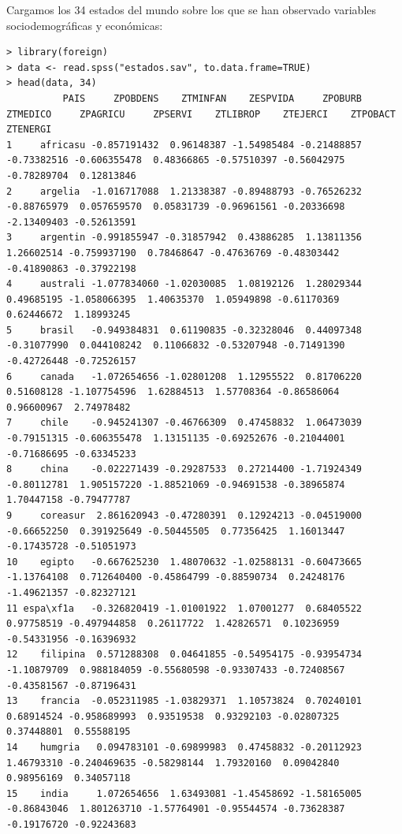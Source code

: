 \documentclass[12pt,twoside]{report}
\begin{document}
Cargamos los 34 estados del mundo sobre los que se han observado variables sociodemográficas y económicas:
\tiny \begin{verbatim}
> library(foreign)
> data <- read.spss("estados.sav", to.data.frame=TRUE)
> head(data, 34)
          PAIS     ZPOBDENS    ZTMINFAN    ZESPVIDA     ZPOBURB    ZTMEDICO     ZPAGRICU     ZPSERVI    ZTLIBROP    ZTEJERCI    ZTPOBACT    ZTENERGI
1     africasu -0.857191432  0.96148387 -1.54985484 -0.21488857 -0.73382516 -0.606355478  0.48366865 -0.57510397 -0.56042975 -0.78289704  0.12813846
2     argelia  -1.016717088  1.21338387 -0.89488793 -0.76526232 -0.88765979  0.057659570  0.05831739 -0.96961561 -0.20336698 -2.13409403 -0.52613591
3     argentin -0.991855947 -0.31857942  0.43886285  1.13811356  1.26602514 -0.759937190  0.78468647 -0.47636769 -0.48303442 -0.41890863 -0.37922198
4     australi -1.077834060 -1.02030085  1.08192126  1.28029344  0.49685195 -1.058066395  1.40635370  1.05949898 -0.61170369  0.62446672  1.18993245
5     brasil   -0.949384831  0.61190835 -0.32328046  0.44097348 -0.31077990  0.044108242  0.11066832 -0.53207948 -0.71491390 -0.42726448 -0.72526157
6     canada   -1.072654656 -1.02801208  1.12955522  0.81706220  0.51608128 -1.107754596  1.62884513  1.57708364 -0.86586064  0.96600967  2.74978482
7     chile    -0.945241307 -0.46766309  0.47458832  1.06473039 -0.79151315 -0.606355478  1.13151135 -0.69252676 -0.21044001 -0.71686695 -0.63345233
8     china    -0.022271439 -0.29287533  0.27214400 -1.71924349 -0.80112781  1.905157220 -1.88521069 -0.94691538 -0.38965874  1.70447158 -0.79477787
9     coreasur  2.861620943 -0.47280391  0.12924213 -0.04519000 -0.66652250  0.391925649 -0.50445505  0.77356425  1.16013447 -0.17435728 -0.51051973
10    egipto   -0.667625230  1.48070632 -1.02588131 -0.60473665 -1.13764108  0.712640400 -0.45864799 -0.88590734  0.24248176 -1.49621357 -0.82327121
11 espa\xf1a   -0.326820419 -1.01001922  1.07001277  0.68405522  0.97758519 -0.497944858  0.26117722  1.42826571  0.10236959 -0.54331956 -0.16396932
12    filipina  0.571288308  0.04641855 -0.54954175 -0.93954734 -1.10879709  0.988184059 -0.55680598 -0.93307433 -0.72408567 -0.43581567 -0.87196431
13    francia  -0.052311985 -1.03829371  1.10573824  0.70240101  0.68914524 -0.958689993  0.93519538  0.93292103 -0.02807325  0.37448801  0.55588195
14    humgria   0.094783101 -0.69899983  0.47458832 -0.20112923  1.46793310 -0.240469635 -0.58298144  1.79320160  0.09042840  0.98956169  0.34057118
15    india     1.072654656  1.63493081 -1.45458692 -1.58165005 -0.86843046  1.801263710 -1.57764901 -0.95544574 -0.73628387 -0.19176720 -0.92243683

\end{verbatim}
\end{document}
